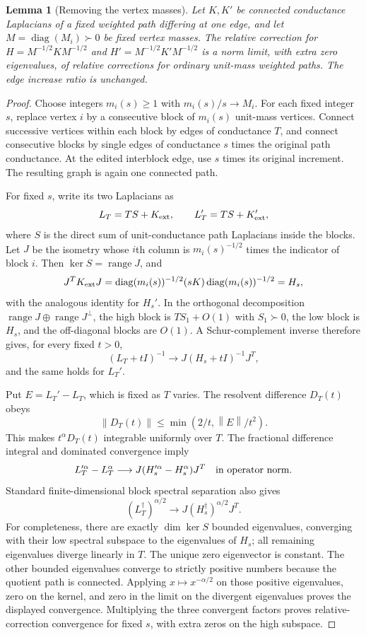 \documentclass[11pt]{article}
\newtheorem{lemma}[theorem]{Lemma}
\newcommand{\norm}[1]{\left\lVert#1\right\rVert}
\newcommand{\diag}{\operatorname{diag}}
\begin{document}
\begin{lemma}[Removing the vertex masses]\label{lem:blowup}
Let $K,K'$ be connected conductance Laplacians of a fixed weighted
path differing at one edge, and let $M=\diag(M_i)\succ0$ be fixed
vertex masses. The relative correction for
$H=M^{-1/2}KM^{-1/2}$ and $H'=M^{-1/2}K'M^{-1/2}$ is a norm limit,
with extra zero eigenvalues, of relative corrections for ordinary
unit-mass weighted paths. The edge increase ratio is unchanged.
\end{lemma}
\begin{proof}
Choose integers $m_i(s)\ge1$ with $m_i(s)/s\to M_i$.
For each fixed integer $s$, replace vertex $i$ by a consecutive block
of $m_i(s)$ unit-mass vertices. Connect successive vertices within
each block by edges of conductance $T$, and connect consecutive blocks
by single edges of conductance $s$ times the original path conductance.
At the edited interblock edge, use $s$ times its original increment.
The resulting graph is again one connected path.

For fixed $s$, write its two Laplacians as
\[
 L_T=TS+K_{\rm ext},\qquad
 L_T'=TS+K_{\rm ext}',
\]
where $S$ is the direct sum of unit-conductance path Laplacians
inside the blocks. Let $J$ be the isometry whose $i$th column is
$m_i(s)^{-1/2}$ times the indicator of block $i$.
Then $\ker S=\operatorname{range}J$, and
\[
 J^TK_{\rm ext}J
  =\diag(m_i(s))^{-1/2}(sK)\diag(m_i(s))^{-1/2}=H_s,
\]
with the analogous identity for $H_s'$.
In the orthogonal decomposition $\operatorname{range}J\oplus
\operatorname{range}J^\perp$, the high block is $TS_1+O(1)$ with
$S_1\succ0$, the low block is $H_s$, and the off-diagonal blocks are
$O(1)$. A Schur-complement inverse therefore gives, for every fixed
$t>0$,
\[
 (L_T+tI)^{-1}\longrightarrow J(H_s+tI)^{-1}J^T,
\]
and the same holds for $L_T'$.

Put $E=L_T'-L_T$, which is fixed as $T$ varies. The resolvent
difference $D_T(t)$ obeys
\[
 \norm{D_T(t)}\le\min(2/t,\norm E/t^2).
\]
This makes $t^\alpha D_T(t)$ integrable uniformly over $T$.
The fractional difference integral and dominated convergence imply
\[
 L_T'^\alpha-L_T^\alpha
       \longrightarrow J(H_s'^\alpha-H_s^\alpha)J^T
       \quad\hbox{in operator norm}.
\]
Standard finite-dimensional block spectral separation also gives
\[
 (L_T^\dagger)^{\alpha/2}
       \longrightarrow J(H_s^\dagger)^{\alpha/2}J^T.
\]
For completeness, there are exactly $\dim\ker S$ bounded
eigenvalues, converging with their low spectral subspace to the
eigenvalues of $H_s$; all remaining eigenvalues diverge linearly in
$T$. The unique zero eigenvector is constant. The other bounded
eigenvalues converge to strictly positive numbers because the quotient
path is connected. Applying $x\mapsto x^{-\alpha/2}$ on those
positive eigenvalues, zero on the kernel, and zero in the limit on
the divergent eigenvalues proves the displayed convergence.
Multiplying the three convergent factors proves relative-correction
convergence for fixed $s$, with extra zeros on the high subspace.


\end{proof}
\end{document}
